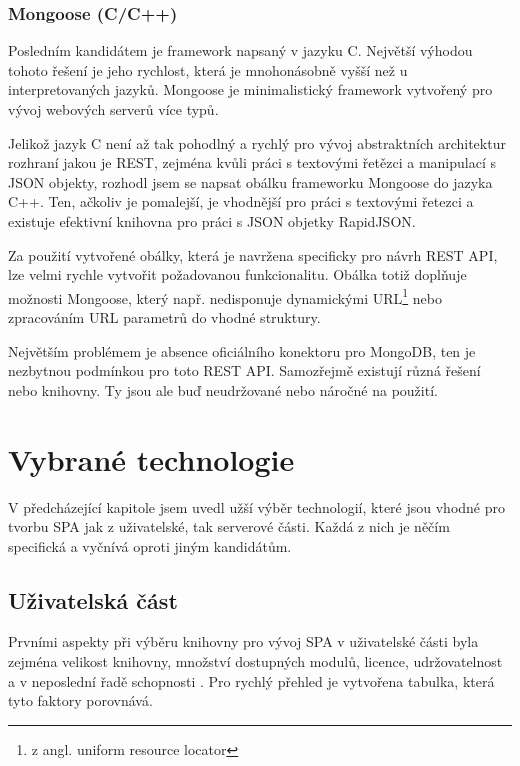 \subsubsection*{Mongoose (C/C++)}

Posledním kandidátem je framework napsaný v jazyku C. Největší výhodou tohoto řešení je jeho rychlost, která je mnohonásobně vyšší než u interpretovaných jazyků. Mongoose je minimalistický framework vytvořený pro vývoj webových serverů více typů.

Jelikož jazyk C není až tak pohodlný a rychlý pro vývoj abstraktních architektur rozhraní jakou je REST, zejména kvůli práci s textovými řetězci a manipulací s JSON objekty, rozhodl jsem se napsat obálku frameworku Mongoose do jazyka C++. Ten, ačkoliv je pomalejší, je vhodnější pro práci s textovými řetezci a existuje efektivní knihovna pro práci s JSON objetky RapidJSON.

Za použití vytvořené obálky, která je navržena specificky pro návrh REST API, lze velmi rychle vytvořit požadovanou funkcionalitu. Obálka totiž doplňuje možnosti Mongoose, který např. nedisponuje dynamickými URL\footnote{z angl. uniform resource locator} nebo zpracováním URL parametrů do vhodné struktury.

Největším problémem je absence oficiálního konektoru pro MongoDB, ten je nezbytnou podmínkou pro toto REST API. Samozřejmě existují různá řešení nebo knihovny. Ty jsou ale buď neudržované nebo náročné na použití.

\section{Vybrané technologie}

V předcházející kapitole jsem uvedl užší výběr technologií, které jsou vhodné pro tvorbu SPA jak z uživatelské, tak serverové části. Každá z nich je něčím specifická a vyčnívá oproti jiným kandidátům.

\subsection{Uživatelská část}

Prvními aspekty při výběru knihovny pro vývoj SPA v uživatelské části byla zejména velikost knihovny, množství dostupných modulů, licence, udržovatelnost a v neposlední řadě schopnosti . Pro rychlý přehled je vytvořena tabulka, která tyto faktory porovnává.


